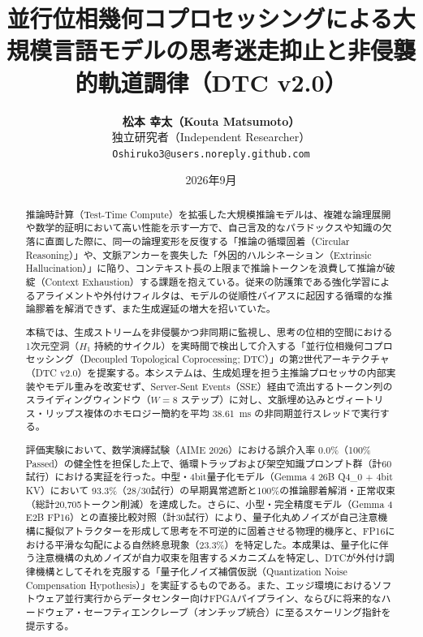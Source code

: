\documentclass[11pt,a4paper]{article}
\title{\textbf{\Large 並行位相幾何コプロセッシングによる大規模言語モデルの思考迷走抑止と非侵襲的軌道調律（DTC v2.0）}}
\author{\textbf{松本 幸太（Kouta Matsumoto）}\\[0.2em]
\normalsize 独立研究者（Independent Researcher）\\
\normalsize \texttt{Oshiruko3@users.noreply.github.com}}
\date{2026年9月}
\begin{document}
\maketitle

\begin{abstract}
\noindent 推論時計算（Test-Time Compute）を拡張した大規模推論モデルは、複雑な論理展開や数学的証明において高い性能を示す一方で、自己言及的なパラドックスや知識の欠落に直面した際に、同一の論理変形を反復する「推論の循環固着（Circular Reasoning）」や、文脈アンカーを喪失した「外因的ハルシネーション（Extrinsic Hallucination）」に陥り、コンテキスト長の上限まで推論トークンを浪費して推論が破綻（Context Exhaustion）する課題を抱えている。従来の防護策である強化学習によるアライメントや外付けフィルタは、モデルの従順性バイアスに起因する循環的な推論膠着を解消できず、また生成遅延の増大を招いていた。

本稿では、生成ストリームを非侵襲かつ非同期に監視し、思考の位相的空間における1次元空洞（$H_1$ 持続的サイクル）を実時間で検出して介入する「並行位相幾何コプロセッシング（Decoupled Topological Coprocessing; DTC）」の第2世代アーキテクチャ（DTC v2.0）を提案する。本システムは、生成処理を担う主推論プロセッサの内部実装やモデル重みを改変せず、Server-Sent Events（SSE）経由で流出するトークン列のスライディングウィンドウ（$W=8$ ステップ）に対し、文脈埋め込みとヴィートリス・リップス複体のホモロジー簡約を平均 38.61~ms の非同期並行スレッドで実行する。

評価実験において、数学演繹試験（AIME 2026）における誤介入率 0.0\%（100\% Passed）の健全性を担保した上で、循環トラップおよび架空知識プロンプト群（計60試行）における実証を行った。中型・4bit量子化モデル（Gemma 4 26B Q4\_0 + 4bit KV）において 93.3\%（28/30試行）の早期異常遮断と100\%の推論膠着解消・正常収束（総計20,705トークン削減）を達成した。さらに、小型・完全精度モデル（Gemma 4 E2B FP16）との直接比較対照（計30試行）により、量子化丸めノイズが自己注意機構に擬似アトラクターを形成して思考を不可逆的に固着させる物理的機序と、FP16における平滑な勾配による自然終息現象（23.3\%）を特定した。本成果は、量子化に伴う注意機構の丸めノイズが自力収束を阻害するメカニズムを特定し、DTCが外付け調律機構としてそれを克服する「量子化ノイズ補償仮説（Quantization Noise Compensation Hypothesis）」を実証するものである。また、エッジ環境におけるソフトウェア並行実行からデータセンター向けFPGAパイプライン、ならびに将来的なハードウェア・セーフティエンクレーブ（オンチップ統合）に至るスケーリング指針を提示する。
\end{abstract}

\vspace{1em}
\end{document}
